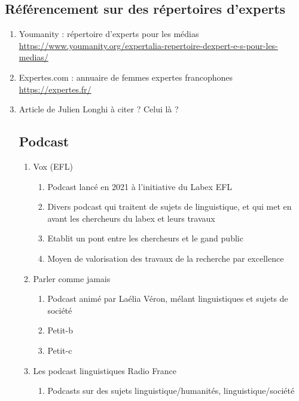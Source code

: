\documentclass{book}
\begin{document}
\subsection*{Référencement sur des répertoires d'experts}
\begin{enumerate}
	\item Youmanity : répertoire d'experts pour les médias \url{https://www.youmanity.org/expertalia-repertoire-dexpert-e-s-pour-les-medias/}
	\item Expertes.com : annuaire de femmes expertes francophones \url{https://expertes.fr/}
    \item Article de Julien Longhi à citer ? Celui là ? \autocite{longhi:hal-03547921}

 \subsection*{Podcast}

 \begin{enumerate}
	\item Vox (EFL)
        \begin{enumerate}
            \item Podcast lancé en 2021 à l'initiative du Labex EFL
            \item Divers podcast qui traitent de sujets de linguistique, et qui met en avant les chercheurs du labex et leurs travaux
            \item Etablit un pont entre les chercheurs et le gand public
            \item Moyen de valorisation des travaux de la recherche par excellence
        \end{enumerate}
	\item Parler comme jamais
        \begin{enumerate}
            \item Podcast animé par Laélia Véron, mélant linguistiques et sujets de société
            \item Petit-b
            \item Petit-c
        \end{enumerate}
	\item Les podcast linguistiques Radio France
        \begin{enumerate}
            \item Podcasts sur des sujets linguistique/humanités, linguistique/société
        \end{enumerate}
\end{enumerate}


\end{enumerate}
\end{document}
